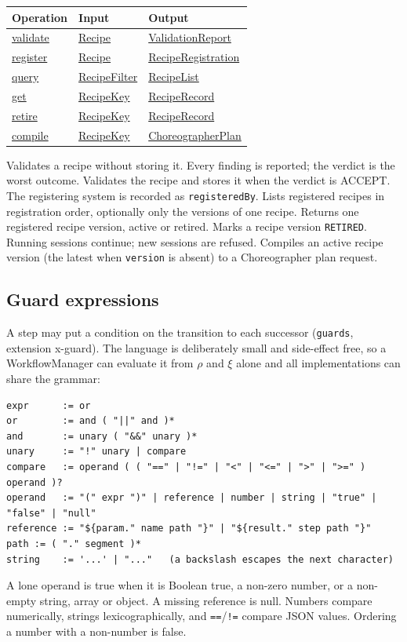 \documentclass[a4paper]{arrowhead}
\newcommand{\mref}[1]{{\textcolor{ArrowheadPurple}{\hyperref[sec:model:#1]{#1}}}}
\newcommand{\oref}[1]{{\textcolor{ArrowheadBlue}{\hyperref[sec:operations:#1]{#1}}}}
\begin{document}
{\small
\begin{longtable}{|p{4.4cm}|p{5.6cm}|p{5.8cm}|}

\hline
\rowcolor{gray!33} Operation & Input & Output \\ \hline
\endhead
\oref{validate} & \mref{Recipe} & \mref{ValidationReport} \\ \hline
\oref{register} & \mref{Recipe} & \mref{RecipeRegistration} \\ \hline
\oref{query} & \mref{RecipeFilter} & \mref{RecipeList} \\ \hline
\oref{get} & \mref{RecipeKey} & \mref{RecipeRecord} \\ \hline
\oref{retire} & \mref{RecipeKey} & \mref{RecipeRecord} \\ \hline
\oref{compile} & \mref{RecipeKey} & \mref{ChoreographerPlan} \\ \hline
\end{longtable}
}

Validates a recipe without storing it. Every finding is reported; the verdict is the worst outcome.
Validates the recipe and stores it when the verdict is ACCEPT. The registering system is recorded as \texttt{registeredBy}.
Lists registered recipes in registration order, optionally only the versions of one recipe.
Returns one registered recipe version, active or retired.
Marks a recipe version \texttt{RETIRED}. Running sessions continue; new sessions are refused.
Compiles an active recipe version (the latest when \texttt{version} is absent) to a Choreographer plan request.

\subsection{Guard expressions}
\label{sec:guards}
A step may put a condition on the transition to each successor (\texttt{guards}, extension x-guard). The language is
deliberately small and side-effect free, so a WorkflowManager can evaluate it from $\rho$ and $\xi$ alone and all
implementations can share the grammar:
\begin{lstlisting}
expr      := or
or        := and ( "||" and )*
and       := unary ( "&&" unary )*
unary     := "!" unary | compare
compare   := operand ( ( "==" | "!=" | "<" | "<=" | ">" | ">=" ) operand )?
operand   := "(" expr ")" | reference | number | string | "true" | "false" | "null"
reference := "${param." name path "}" | "${result." step path "}"   path := ( "." segment )*
string    := '...' | "..."   (a backslash escapes the next character)
\end{lstlisting}
A lone operand is true when it is Boolean true, a non-zero number, or a non-empty string, array or object. A missing
reference is null. Numbers compare numerically, strings lexicographically, and \texttt{==}/\texttt{!=} compare JSON
values. Ordering a number with a non-number is false.
\end{document}
